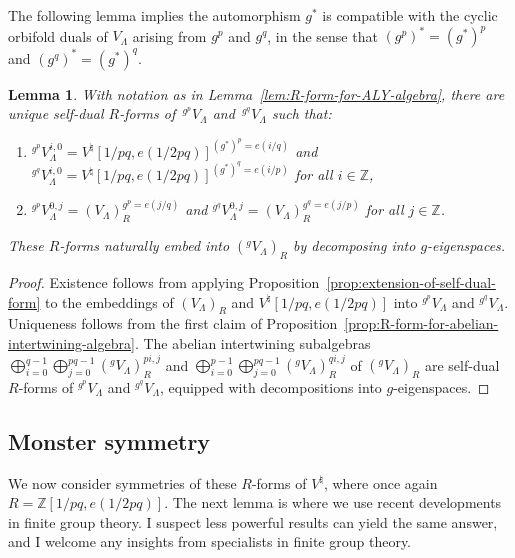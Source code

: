 \documentclass[pdftex]{sigma}
\newcommand{\bZ}{\mathbb{Z}}
\newtheorem{lem}[thm]{Lemma}
\theoremstyle{definition}
\begin{document}
The following lemma implies the automorphism $g^*$ is compatible with the cyclic orbifold duals of $V_\Lambda$ arising from $g^p$ and $g^q$, in the sense that $(g^p)^* = (g^*)^p$ and $(g^q)^* = (g^*)^q$.

\begin{lem} \label{lem:R-forms-for-prime-order-orbifold}
With notation as in Lemma~{\rm \ref{lem:R-form-for-ALY-algebra}}, there are unique self-dual $R$-forms of~${}^{g^p}V_\Lambda$ and~${}^{g^q}V_\Lambda$ such that:
\begin{enumerate}\itemsep=0pt
\item[$1)$] ${}^{g^p}V_\Lambda^{i,0} = V^\natural[1/pq,e(1/2pq)]^{(g^*)^p = e(i/q)}$ and ${}^{g^q}V_\Lambda^{i,0} = V^\natural[1/pq,e(1/2pq)]^{(g^*)^q = e(i/p)}$ for all $i \in \bZ$,
\item[$2)$] ${}^{g^p}V_\Lambda^{0,j} = (V_\Lambda)_R^{g^p = e(j/q)}$ and ${}^{g^q}V_\Lambda^{0,j} = (V_\Lambda)_R^{g^q = e(j/p)}$ for all $j \in \bZ$.
\end{enumerate}
These $R$-forms naturally embed into $({}^g V_\Lambda)_R$ by decomposing into $g$-eigenspaces.
\end{lem}
\begin{proof}Existence follows from applying Proposition~\ref{prop:extension-of-self-dual-form} to the embeddings of $(V_\Lambda)_R$ and $V^\natural[1/pq,e(1/2pq)]$ into ${}^{g^p}V_\Lambda$ and ${}^{g^q}V_\Lambda$. Uniqueness follows from the first claim of Proposition~\ref{prop:R-form-for-abelian-intertwining-algebra}. The abelian intertwining subalgebras $\bigoplus_{i=0}^{q-1} \bigoplus_{j=0}^{pq-1} ({}^gV_\Lambda)_R^{pi,j}$ and $\bigoplus_{i=0}^{p-1} \bigoplus_{j=0}^{pq-1} ({}^gV_\Lambda)_R^{qi,j}$ of $({}^g V_\Lambda)_R$ are self-dual $R$-forms of ${}^{g^p}V_\Lambda$ and ${}^{g^q}V_\Lambda$, equipped with decompositions into $g$-eigen\-spa\-ces.
\end{proof}

\subsection{Monster symmetry}

We now consider symmetries of these $R$-forms of $V^\natural$, where once again $R = \bZ[1/pq, e(1/2pq)]$. The next lemma is where we use recent developments in finite group theory. I suspect less powerful results can yield the same answer, and I welcome any insights from specialists in finite group theory.
\end{document}
